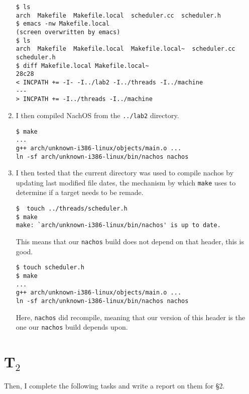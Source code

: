\documentclass[letterpaper, 10pt]{article}
\begin{document}
\begin{enumerate}
{	\begin{verbatim}
$ ls
arch  Makefile  Makefile.local  scheduler.cc  scheduler.h
$ emacs -nw Makefile.local
(screen overwritten by emacs)
$ ls
arch  Makefile  Makefile.local  Makefile.local~  scheduler.cc  scheduler.h
$ diff Makefile.local Makefile.local~
28c28
< INCPATH += -I- -I../lab2 -I../threads -I../machine
---
> INCPATH += -I../threads -I../machine
	\end{verbatim}
	}

	\item{
	I then compiled NachOS from the {\tt ../lab2} directory.

	\begin{verbatim}
$ make
...
g++ arch/unknown-i386-linux/objects/main.o ...
ln -sf arch/unknown-i386-linux/bin/nachos nachos
	\end{verbatim}
	}

	\item{
	I then tested that the current directory was used to compile nachos by updating last modified file dates, the mechanism by which {\tt make} uses to determine if a target needs to be remade.

	\begin{verbatim}
$  touch ../threads/scheduler.h
$ make
make: `arch/unknown-i386-linux/bin/nachos' is up to date.
	\end{verbatim}

	This means that our {\tt nachos} build does not depend on that header, this is good.

	\begin{verbatim}
$ touch scheduler.h
$ make
...
g++ arch/unknown-i386-linux/objects/main.o ...
ln -sf arch/unknown-i386-linux/bin/nachos nachos
	\end{verbatim}

	Here, {\tt nachos} did recompile, meaning that our version of this header is the one our {\tt nachos} build depends upon.
	}

	\end{enumerate}

	\section*{T$_{2}$}

	Then, I complete the following tasks and write a report on them for \S2.
\end{document}

